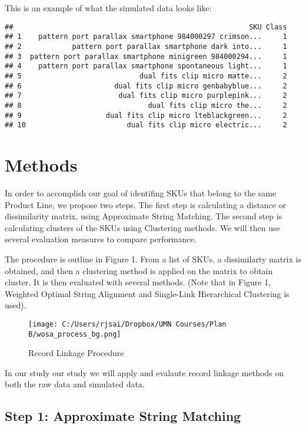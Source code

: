 \documentclass[]{article}
\begin{document}
This is an example of what the simulated data looks like:

\begin{verbatim}
##                                                        SKU Class
## 1    pattern port parallax smartphone 984000297 crimson...     1
## 2            pattern port parallax smartphone dark into...     1
## 3  pattern port parallax smartphone minigreen 984000294...     1
## 4    pattern port parallax smartphone spontaneous light...     1
## 5                            dual fits clip micro matte...     2
## 6                      dual fits clip micro genbabyblue...     2
## 7                       dual fits clip micro purplepink...     2
## 8                              dual fits clip micro the...     2
## 9                    dual fits clip micro lteblackgreen...     2
## 10                        dual fits clip micro electric...     2
\end{verbatim}

\section{Methods}\label{methods}

In order to accomplish our goal of identifing SKUs that belong to the
same Product Line, we propose two steps. The first step is calculating a
distance or dissimilarity matrix, using Approximate String Matching. The
second step is calculating clusters of the SKUs using Clustering
methods. We will then use several evaluation measures to compare
performance.

The procedure is outline in Figure 1. From a list of SKUs, a
dissimilarty matrix is obtained, and then a clustering method is applied
on the matrix to obtain cluster. It is then evaluated with several
methods. (Note that in Figure 1, Weighted Optimal String Alignment and
Single-Link Hierarchical Clustering is used).

\begin{figure}
\centering
\texttt{[image: C:/Users/rjsai/Dropbox/UMN Courses/Plan B/wosa\_process\_bg.png]}
\caption{Record Linkage Procedure}
\end{figure}

In our study our study we will apply and evalaute record linkage methods
on both the raw data and simulated data.

\subsection{Step 1: Approximate String
Matching}\label{step-1-approximate-string-matching}
\end{document}
